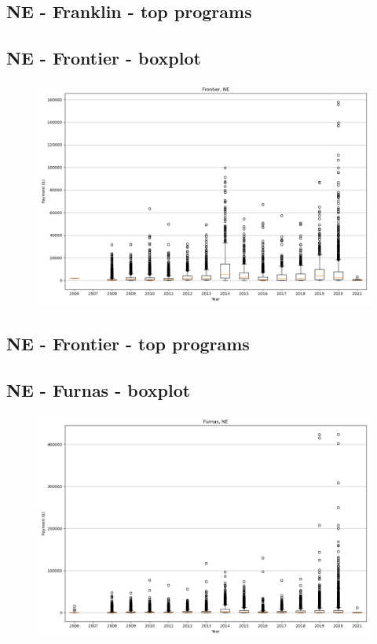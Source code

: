 \subsection*{NE - Franklin - top programs}

\newpage
\subsection*{NE - Frontier - boxplot}
\begin{figure}[h]
\centering
\includegraphics[width=7in]{../output/boxplots/counties/Frontier-NE_boxplot.png}
\end{figure}


\subsection*{NE - Frontier - top programs}

\newpage
\subsection*{NE - Furnas - boxplot}
\begin{figure}[h]
\centering
\includegraphics[width=7in]{../output/boxplots/counties/Furnas-NE_boxplot.png}
\end{figure}


